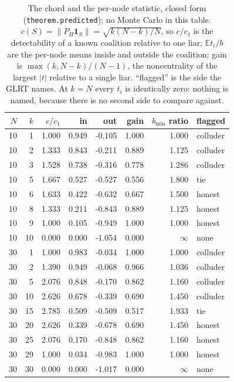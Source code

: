 \begin{table}[t]
\centering
\caption{The chord and the per-node statistic, closed form (\texttt{theorem.predicted}); no Monte Carlo in this table. $c(S)=\|P_H\mathbf{1}_S\|=\sqrt{k(N-k)/N}$, so $c/c_1$ is the detectability of a known coalition relative to one liar; $\mathbb{E}t_i/b$ are the per-node means inside and outside the coalition; gain is $\max(k,N-k)/(N-1)$, the noncentrality of the largest $|t|$ relative to a single liar. ``flagged'' is the side the GLRT names. At $k=N$ every $t_i$ is identically zero: nothing is named, because there is no second side to compare against.}
\label{tab:chord}
\small
\begin{tabular}{@{}r r r r r r r l@{}}
\toprule
$N$ & $k$ & $c/c_1$ & in & out & gain & $b_{\min}$ ratio & flagged \\
\midrule
10 & 1 & 1.000 & 0.949 & -0.105 & 1.000 & 1.000 & colluder \\
10 & 2 & 1.333 & 0.843 & -0.211 & 0.889 & 1.125 & colluder \\
10 & 3 & 1.528 & 0.738 & -0.316 & 0.778 & 1.286 & colluder \\
10 & 5 & 1.667 & 0.527 & -0.527 & 0.556 & 1.800 & tie \\
10 & 6 & 1.633 & 0.422 & -0.632 & 0.667 & 1.500 & honest \\
10 & 8 & 1.333 & 0.211 & -0.843 & 0.889 & 1.125 & honest \\
10 & 9 & 1.000 & 0.105 & -0.949 & 1.000 & 1.000 & honest \\
10 & 10 & 0.000 & 0.000 & -1.054 & 0.000 & $\infty$ & none \\
30 & 1 & 1.000 & 0.983 & -0.034 & 1.000 & 1.000 & colluder \\
30 & 2 & 1.390 & 0.949 & -0.068 & 0.966 & 1.036 & colluder \\
30 & 5 & 2.076 & 0.848 & -0.170 & 0.862 & 1.160 & colluder \\
30 & 10 & 2.626 & 0.678 & -0.339 & 0.690 & 1.450 & colluder \\
30 & 15 & 2.785 & 0.509 & -0.509 & 0.517 & 1.933 & tie \\
30 & 20 & 2.626 & 0.339 & -0.678 & 0.690 & 1.450 & honest \\
30 & 25 & 2.076 & 0.170 & -0.848 & 0.862 & 1.160 & honest \\
30 & 29 & 1.000 & 0.034 & -0.983 & 1.000 & 1.000 & honest \\
30 & 30 & 0.000 & 0.000 & -1.017 & 0.000 & $\infty$ & none \\
\bottomrule
\end{tabular}
\end{table}
